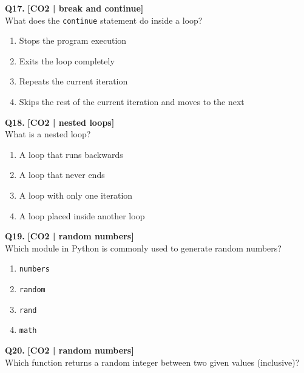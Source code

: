 \noindent\textbf{Q17.} \hfill {\small\color{LPUOrange}\textbf{[CO2 | break and continue]}}\\[2pt]
What does the \texttt{continue} statement do inside a loop?

\begin{enumerate}[label=(\alph*),topsep=2pt,itemsep=1pt,partopsep=0pt,parsep=0pt]
    \item \relax Stops the program execution
    \item \relax Exits the loop completely
    \item \relax Repeats the current iteration
    \item \relax Skips the rest of the current iteration and moves to the next
\end{enumerate}
\vspace{{2mm}}

\noindent\textbf{Q18.} \hfill {\small\color{LPUOrange}\textbf{[CO2 | nested loops]}}\\[2pt]
What is a nested loop?

\begin{enumerate}[label=(\alph*),topsep=2pt,itemsep=1pt,partopsep=0pt,parsep=0pt]
    \item \relax A loop that runs backwards
    \item \relax A loop that never ends
    \item \relax A loop with only one iteration
    \item \relax A loop placed inside another loop
\end{enumerate}
\vspace{{2mm}}

\noindent\textbf{Q19.} \hfill {\small\color{LPUOrange}\textbf{[CO2 | random numbers]}}\\[2pt]
Which module in Python is commonly used to generate random numbers?

\begin{enumerate}[label=(\alph*),topsep=2pt,itemsep=1pt,partopsep=0pt,parsep=0pt]
    \item \relax \texttt{numbers}
    \item \relax \texttt{random}
    \item \relax \texttt{rand}
    \item \relax \texttt{math}
\end{enumerate}
\vspace{{2mm}}

\noindent\textbf{Q20.} \hfill {\small\color{LPUOrange}\textbf{[CO2 | random numbers]}}\\[2pt]
Which function returns a random integer between two given values (inclusive)?

